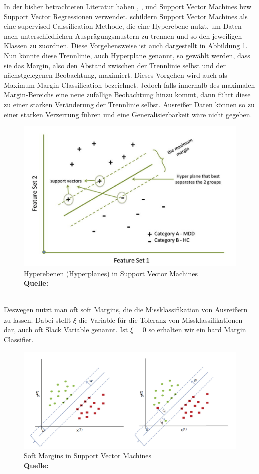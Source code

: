 \documentclass[a4paper,12pt]{thesis}
\newcommand*{\captionsource}[2]{%
	\caption[{#1}]{%
		#1%
		\\\hspace{\linewidth}%
		\textbf{Quelle:} #2%
	}%
}
\begin{document}
In der bisher betrachteten Literatur haben \cite{Holmgren2017}, \cite{Broucke2019}, \cite{Xu2013} und \cite{Gao2022} Support Vector Machines bzw Support Vector Regressionen verwendet. \cite{Pisner2020} schildern Support Vector Machines als eine supervised Calssification Methode, die eine Hyperebene nutzt, um Daten nach unterschiedlichen Ausprägungsmustern zu trennen und so den jeweiligen Klassen zu zuordnen. Diese Vorgehensweise ist auch dargestellt in Abbildung \ref{SVM}. Nun könnte diese Trennlinie, auch Hyperplane genannt, so gewählt werden, dass sie das Margin, also den Abstand zwischen der Trennlinie selbst und der nächstgelegenen Beobachtung, maximiert. Dieses Vorgehen wird auch als Maximum Margin Classification bezeichnet. Jedoch falls innerhalb des maximalen Margin-Bereichs eine neue zufällige Beobachtung hinzu kommt, dann führt diese zu einer starken Veränderung der Trennlinie selbst. Ausreißer Daten können so zu einer starken Verzerrung führen und eine Generalisierbarkeit wäre nicht gegeben.
\begin{figure}[!ht]
	\centering
	\includegraphics[width=\textwidth]{Plots/SVM.png}
	\captionsource{Hyperebenen (Hyperplanes) in Support Vector Machines}{
		\cite{Pisner2020}
	}
	\label{SVM}
\end{figure}\\
Deswegen nutzt man oft soft Margins, die die Missklassifikation von Ausreißern zu lassen. Dabei stellt $\xi$ die Variable für die Toleranz von Missklassifikationen dar, auch oft Slack Variable genannt. Ist $\xi=0$ so erhalten wir ein hard Margin Classifier.
\begin{figure}[!ht]
	\centering
	\includegraphics[width=\textwidth]{Plots/SVM2.png}
	\captionsource{Soft Margins in Support Vector Machines}{
		\cite{Pisner2020}
	}
	\label{SVM2}
\end{figure}\\
\end{document}
